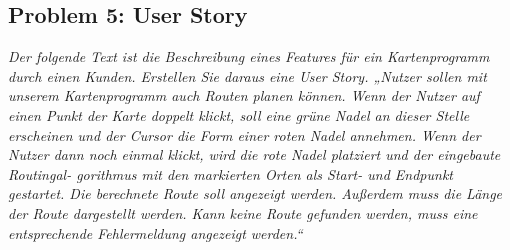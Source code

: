 \documentclass[
  ngerman,
  DIV=14
]{scrartcl}
\begin{document}
\subsection*{Problem 5: User Story}
\emph{Der folgende Text ist die Beschreibung eines Features für ein Kartenprogramm durch einen Kunden. Erstellen Sie daraus eine User Story.
„Nutzer sollen mit unserem Kartenprogramm auch Routen planen können. Wenn der Nutzer auf einen Punkt der Karte doppelt klickt, soll eine grüne Nadel an dieser Stelle erscheinen und der Cursor die Form einer roten Nadel annehmen. Wenn der Nutzer dann noch einmal klickt, wird die rote Nadel platziert und der eingebaute Routingal- gorithmus mit den markierten Orten als Start- und Endpunkt gestartet. Die berechnete Route soll angezeigt werden. Außerdem muss die Länge der Route dargestellt werden. Kann keine Route gefunden werden, muss eine entsprechende Fehlermeldung angezeigt werden.“}
\end{document}
